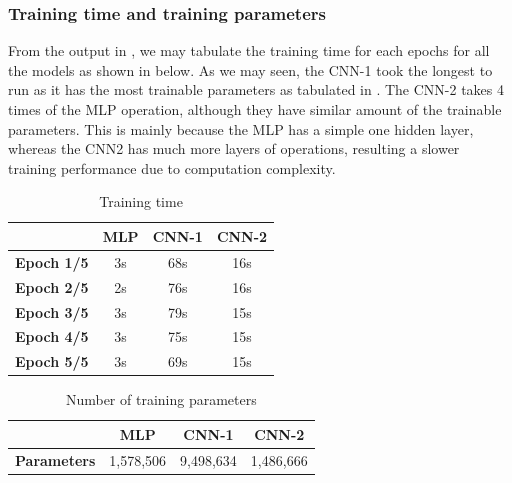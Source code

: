 \documentclass{tron}
\begin{document}
\subsubsection{Training time and training parameters}
From the output in , we may tabulate the training time for each epochs for all the models as shown in  below. As we may seen, the CNN-1 took the longest to run as it has the most trainable parameters as tabulated in . The CNN-2 takes 4 times of the MLP operation, although they have similar amount of the trainable parameters. This is mainly because the MLP has a simple one hidden layer, whereas the CNN2 has much more layers of operations, resulting a slower training performance due to computation complexity.
\begin{table}[h!]
  \begin{center}
    \caption{Training time}
    \label{table:p3:time}
    \begin{tabular}{|l|c|c|c|}
      \hline 
      & \textbf{MLP} & \textbf{CNN-1} & \textbf{CNN-2}\\
      \hline 
      \hline 
		\textbf{Epoch 1/5} & 3s & 68s & 16s \\
		\hline
		\textbf{Epoch 2/5} & 2s & 76s & 16s \\
		\hline
		\textbf{Epoch 3/5} & 3s & 79s & 15s \\
		\hline
		\textbf{Epoch 4/5} & 3s & 75s & 15s \\
		\hline
		\textbf{Epoch 5/5} & 3s & 69s & 15s \\
		\hline
      \hline 
    \end{tabular}
  \end{center}
\end{table}


\begin{table}[h!]
  \begin{center}
    \caption{Number of training parameters}
    \label{table:p3:params}
    \begin{tabular}{|l|c|c|c|}
      \hline 
      & \textbf{MLP} & \textbf{CNN-1} & \textbf{CNN-2}\\
      \hline 
      \hline 
		\textbf{Parameters} & 1,578,506 & 9,498,634 & 1,486,666 \\
		\hline
      \hline 
    \end{tabular}
  \end{center}
\end{table}
\end{document}
